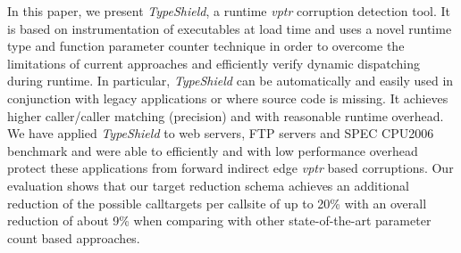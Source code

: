
In this paper, we present \textit{TypeShield}, a runtime \textit{vptr} corruption
detection tool. It is based on instrumentation of executables at load time
and uses a novel runtime type and function parameter counter technique
in order to overcome the limitations of current approaches and efficiently
verify dynamic dispatching during runtime.
In particular, \textit{TypeShield} can be automatically and easily used
in conjunction with legacy applications or where source code is missing.
It achieves higher caller/caller matching (precision) and with reasonable
runtime overhead.
We have applied \textit{TypeShield} to
web servers, FTP servers and SPEC CPU2006 benchmark and were able to efficiently
and with low performance overhead protect these applications from forward indirect edge
\textit{vptr} based corruptions.
Our evaluation shows that our target reduction schema achieves an additional
reduction of the possible calltargets per callsite of up to 
20\% with an overall reduction of about 9\% when comparing with other state-of-the-art
parameter count based approaches.
